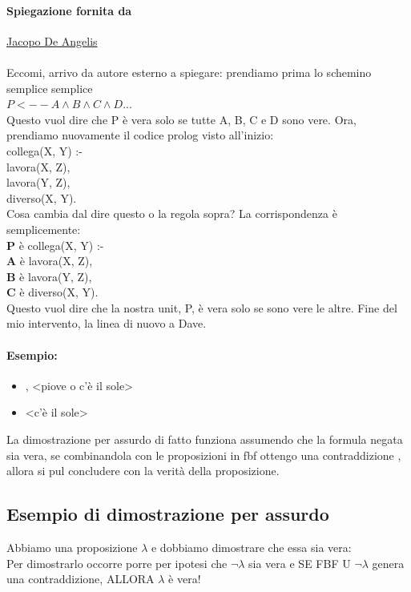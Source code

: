 \documentclass[12pt, a4paper, openany, oneside]{book}
\newcommand\tab[1][1cm]{\hspace*{#1}}
\begin{document}
\paragraph{Spiegazione fornita da} \href{https://github.com/JacopoDeAngelis}
{Jacopo De Angelis} \\ \\
Eccomi, arrivo da autore esterno a spiegare: prendiamo prima lo schemino semplice
semplice \\
$ P <-- A \wedge B \wedge C \wedge D ...$ \\
Questo vuol dire che P è vera solo se tutte A, B, C e D sono vere. Ora, prendiamo 
nuovamente il codice prolog visto all'inizio: \\
\color{red}
collega(X, Y) :-  \\	
\tab lavora(X, Z), \\	
\tab lavora(Y, Z), \\	
\tab diverso(X, Y). \color{black}\\
Cosa cambia dal dire questo o la regola sopra? La corrispondenza è semplicemente: \\
\color{red}
\textbf{P} è collega(X, Y) :-  \\	
\tab \textbf{A} è lavora(X, Z), \\	
\tab \textbf{B} è lavora(Y, Z), \\	
\tab \textbf{C} è diverso(X, Y). \color{black}\\
Questo vuol dire che la nostra unit, P, è vera solo se sono vere le altre. Fine 
del mio intervento, la linea di nuovo a Dave.
\paragraph{Esempio:} 
\begin{itemize}
	\item <non piove>, <piove o c'è il sole>
	\item <c'è il sole>
\end{itemize}
La dimostrazione per assurdo di fatto funziona assumendo che la formula negata
sia vera, se combinandola con le proposizioni in fbf ottengo una contraddizione
, allora si pul concludere con la verità della proposizione.
\subsection{Esempio di dimostrazione per assurdo}
Abbiamo una proposizione $\lambda$ e dobbiamo dimostrare che essa sia vera: \\
Per dimostrarlo occorre porre per ipotesi che $\neg \lambda$ sia vera e 
\color{red}SE \color{black} FBF U {$\neg \lambda$} genera una contraddizione,
\color{red}ALLORA \color{black} $\lambda$ è vera!
\end{document}
